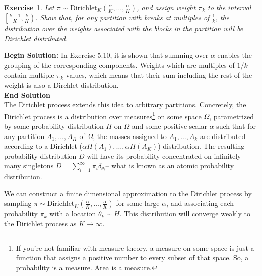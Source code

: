 \documentclass[twoside]{article}
\newcounter{lecnum}
\newtheorem{exercise}{Exercise}[lecnum]
\begin{document}


   \begin{exercise}
     Let $\pi\sim \mbox{Dirichlet}_K\left(\frac{\alpha}{K},\dots,\frac{\alpha}{K}\right)$, and assign weight $\pi_k$ to the interval $\left[\frac{k-1}{K},\frac{k}{K}\right)$. Show that, for any partition with breaks at multiples of $\frac{1}{k}$, the distribution over the weights associated with the blocks in the partition will be Dirichlet distributed.
   \end{exercise}
\textbf{Begin Solution:}
In Exercise 5.10, it is shown that summing over $\alpha$ enables the grouping of the corresponding components. Weights which are multiples of $1/k$ contain multiple $\pi_k$ values, which means that their sum including the rest of the weight is also a Dirchlet distribution.\\
\textbf{End Solution}\\
   The Dirichlet process extends this idea to arbitrary partitions. Concretely, the Dirichlet process is a distribution over measures\footnote{If you're not familiar with measure theory, a measure on some space is just a function that assigns a positive number to every subset of that space. So, a probability is a measure. Area is a measure.} on some space $\mathcal{\Omega}$, parametrized by some probability distribution $H$ on $\Omega$ and some positive scalar $\alpha$ such that for any partition $A_1,\dots,A_K$ of $\Omega$, the masses assigned to $A_1,\dots, A_k$ are distributed according to a Dirichlet ($\alpha H(A_1),\dots, \alpha H(A_K)$) distribution. The resulting probability distribution $D$ will have its probability concentrated on infinitely many singletons $D=\sum_{i=1}^\infty \pi_i \delta_{\theta_i}$-- what is known as an atomic probability distribution.

   We can construct a finite dimensional approximation to the Dirichlet process by sampling $\pi\sim\mbox{Dirichlet}_K\left(\frac{\alpha}{K},\dots,\frac{\alpha}{K}\right)$ for some large $\alpha$, and associating each probability $\pi_k$ with a location $\theta_k\sim H$. This distribution will converge weakly to the Dirichlet process as $K\rightarrow \infty$.
\end{document}
